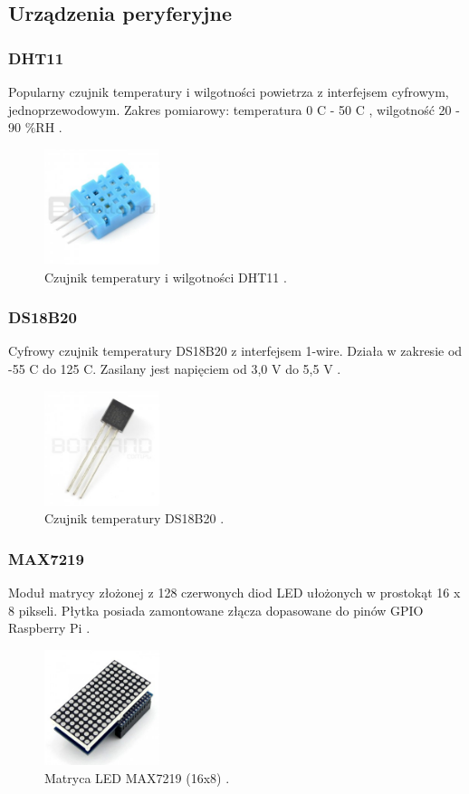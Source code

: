 \documentclass[12pt]{report}
\let\Oldsubsection\subsection
\renewcommand{\subsection}{\FloatBarrier\Oldsubsection}
\let\Oldsubsubsection\subsubsection
\renewcommand{\subsubsection}{\FloatBarrier\Oldsubsubsection}
\begin{document}
{\subsection{Urządzenia peryferyjne}
\subsubsection{DHT11}
Popularny czujnik temperatury i wilgotności powietrza z interfejsem cyfrowym, jednoprzewodowym. Zakres pomiarowy: temperatura 0 \textdegree{}C - 50 \textdegree{}C , wilgotność 20 - 90 \%RH \cite{dht11Botland}. %
\begin{figure}[h]
	\centering
	\includegraphics[width=0.3\textwidth]{images/dht11.jpg}
	\caption{Czujnik temperatury i wilgotności DHT11 \cite{dht11Img}.}
\end{figure}
\subsubsection{DS18B20}
Cyfrowy czujnik temperatury DS18B20 z interfejsem 1-wire. Działa w zakresie od -55 \textdegree{}C do 125 \textdegree{}C. Zasilany jest napięciem od 3,0 V do 5,5 V \cite{ds18b20Botland}. %
\begin{figure}[h]
	\centering
	\includegraphics[width=0.3\textwidth]{images/ds18b20.jpg}
	\caption{Czujnik temperatury DS18B20 \cite{ds18b20Img}.}
\end{figure}
\subsubsection{MAX7219}
Moduł matrycy złożonej z 128 czerwonych diod LED ułożonych w prostokąt 16 x 8 pikseli. Płytka posiada zamontowane złącza dopasowane do pinów GPIO Raspberry Pi \cite{max7219Botland}. %
\begin{figure}[h]
	\centering
	\includegraphics[width=0.3\textwidth]{images/max7219.jpg}
	\caption{Matryca LED MAX7219 (16x8) \cite{max7219Img}.}
\end{figure}
}
\end{document}
